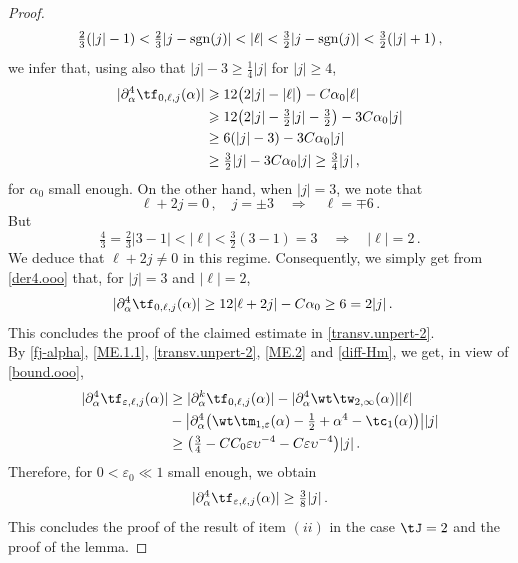 \documentclass[a4paper,reqno,10pt]{article}
\newcommand{\pa}{\partial}
\begin{document}
\begin{proof}
\begin{equation}\label{bound.ooo}
   \tfrac23(|j|-1)<\tfrac23|j-\operatorname{sgn}(j)|< |\ell|< \tfrac32 |j-{\rm sgn}(j)| < \tfrac32(|j|+1) \,,
\end{equation}
we infer that, using also that $|j|-3 \geq \tfrac14 |j|$ for $|j|\geq 4$,
\begin{align*}
	|\pa_{\alpha}^4\tf_{0,\ell,j}(\alpha)|
	&\geqslant 12\big( 2|j|- |\ell|\big) - C\alpha_0|\ell| \\
	&\geqslant 12 \big( 2|j| - \tfrac32 |j| - \tfrac32 \big) - 3 C\alpha_0 |j| \\
    & \geq 6 (|j|-3) - 3C \alpha_0 |j| \\
    & \geq \tfrac32 |j| - 3C \alpha_0 |j| \geq \tfrac34 |j| \,,
\end{align*}
for $\alpha_0$ small enough. On the other hand, when $|j|=3$, we note that
\begin{equation}
    \ell + 2 j = 0 \,, \quad  j= \pm 3 \quad \Rightarrow \quad \ell = \mp 6 \,.
 \end{equation}
 But
 \begin{equation}
    \tfrac43 =\tfrac23 |3 - 1| < |\ell| < \tfrac32 (3-1)= 3  \quad \Rightarrow \quad |\ell| = 2 \,.
 \end{equation}
 We deduce that $\ell + 2j\neq 0$ in this regime. Consequently, we simply get from \eqref{der4.ooo} that, for $|j|=3$ and $|\ell|=2$,
 \begin{align}
     |\pa_{\alpha}^4\tf_{0,\ell,j}(\alpha)| & \geq 12 |\ell + 2 j| - C\alpha_0 \geq 6 = 2|j| \,.
 \end{align}
 This concludes the proof of the claimed estimate in  \eqref{transv.unpert-2}.
 \\[1mm]
     By \eqref{fj-alpha}, \eqref{ME.1.1}, \eqref{transv.unpert-2}, \eqref{ME.2} and \eqref{diff-Hm}, we get, in view of \eqref{bound.ooo},
	\begin{align}
            |\pa_{\alpha}^4\tf_{\varepsilon,\ell,j}(\alpha)|& \geq 
            |\pa_{\alpha}^k \tf_{0,\ell,j}(\alpha)| - 
            |\pa_{\alpha}^4 \wt\tw_{2,\infty}(\alpha)| |\ell| \\&-
            \big| \pa_{\alpha}^4 \big( \wt\tm_{1,\varepsilon}(\alpha) - \tfrac12 + \alpha^4 - \tc_{1}(\alpha) \big) \big| |j| \\
			& \geq \big( \tfrac34   - C C_0 \varepsilon \upsilon^{-4}  - C \varepsilon \upsilon^{-4}  \big) |j|\,.
		\end{align}
	Therefore, for  $0< \varepsilon_{0} \ll 1$ small enough, we obtain 
    $$
    |\pa_{\alpha}^4\tf_{\varepsilon,\ell,j}(\alpha)|\geq \tfrac38 |j| \,.
    $$
    This concludes the proof of the result of item $(ii)$ in the case $\tJ= 2$ and the proof of the lemma.
\end{proof}
\end{document}
